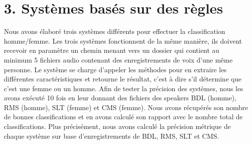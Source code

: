 \documentclass[a4paper,12pt]{report}	%
\begin{document}
{\section*{3. Systèmes basés sur des règles}}
Nous avons élaboré trois systèmes différents pour effectuer la classification homme/femme. Les trois systèmes fonctionnent de la même manière, ils doivent recevoir en paramètre un chemin menant vers un dossier qui contient au minimum 5 fichiers audio contenant des enregistrements de voix d'une même personne. Le système se charge d'appeler les méthodes pour en extraire les différentes caractéristiques et retourne le résultat, c'est à dire s'il détermine que c'est une femme ou un homme. Afin de tester la précision des systèmes, nous les avons exécuté 10 fois en leur donnant des fichiers des speakers BDL (homme), RMS (homme), SLT (femme) et CMS (femme). Nous avons récupérés son nombre de bonnes classifications et en avons calculé son rapport avec le nombre total de classifications. Plus précisément, nous avons calculé la précision métrique de chaque système sur base d'enregistrements de BDL, RMS, SLT et CMS.
\end{document}
